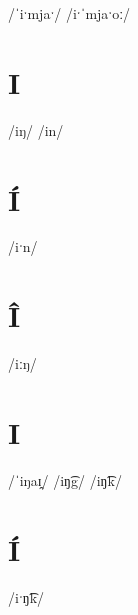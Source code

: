 \documentclass[10pt,a4paper,twoside]{book}
\begin{document}
\begin{multicols}{3}
 {/ˈiˑmjaˑ/} {}
 {/iˑˈmjaˑoː/} {}
\end{multicols}

\section*{I}

\begin{multicols}{3}
 {/iŋ/} {}
 {/in/} {}
\end{multicols}

\section*{Í}

\begin{multicols}{3}
 {/iˑn/} {}
\end{multicols}

\section*{Î}

\begin{multicols}{3}
 {/iːŋ/} {}
\end{multicols}

\section*{I}

\begin{multicols}{3}
 {/ˈiŋaɪ̯/} {}
 {/iŋ͡g/} {}
 {/iŋ͡k/} {}
\end{multicols}

\section*{Í}

\begin{multicols}{3}
 {/iˑŋ͡k/} {}
\end{multicols}
\end{document}
